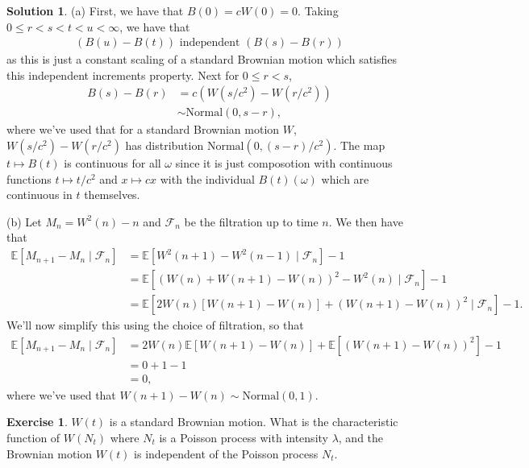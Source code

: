 \documentclass[12pt]{article}
\newcommand{\calF}{\mathcal{F}}
\newcommand{\Expect}{\mathbb{E}}
\theoremstyle{definition}
\newtheorem{exer}{Exercise}
\newtheorem{sol}{Solution}
\theoremstyle{remark}
\begin{document}
\begin{sol}
    (a) First, we have that  $B(0) = c W(0) = 0$. Taking $0 \leq r < s < t < u < \infty$, we have that
    \begin{align*}
        (B(u) - B(t)) \text{ independent } (B(s) - B(r))
    \end{align*}
    as this is just a constant scaling of a standard Brownian motion which satisfies this independent increments property.
    Next for $0\leq r < s$,
    \begin{align*}
        B(s) - B(r) &= c (W(s  / c^{2}) - W(r / c^{2}))\\
                    &\sim  \text{Normal}(0, s-r),
    \end{align*}
    where we've used that for a standard Brownian motion $W$, $W(s  / c^{2}) - W(r / c^{2})$ has distribution $\text{Normal}(0, (s - r) / c^{2})$. The map $t \mapsto B(t)$ is continuous for all $\omega$ since it is just composotion with continuous functions $t \mapsto t / c^{2}$ and $ x\mapsto cx$ with the individual $B(t)(\omega)$ which are continuous in $t$ themselves.

    (b) Let $M_{n} = W^{2}(n) - n$ and $\calF_{n}$ be the filtration up to time $n$. We then have that
    \begin{align*}
        \Expect[M_{n+1} - M_{n} \mid \calF_{n}] &= \Expect[W^{2}(n+1) - W^{2}(n-1)\mid \calF_{n}] - 1\\
                                                &= \Expect[ (W(n) + W(n+1) - W(n) )^{2} - W^{2}(n) \mid \calF_{n} ] - 1\\
                                                &= \Expect[ 2 W(n)[ W(n+1) - W(n) ] + (W(n+1) - W(n))^{2}  \mid \calF_{n}] -1.
    \end{align*}
    We'll now simplify this using the choice of filtration, so that
    \begin{align*}
        \Expect[M_{n+1} - M_{n} \mid \calF_{n}] &= 2 W(n) \Expect[ W(n+1) - W(n)] + \Expect[ (W(n+1) - W(n))^{2}] - 1\\
                                                &= 0 + 1 - 1\\
                                                &= 0,
    \end{align*}
    where we've used that $W(n + 1) - W(n) \sim \text{Normal}(0,1)$.
\end{sol}

\newpage

\begin{exer}
 $W(t)$ is a standard Brownian motion.
What is the characteristic function of $W(N_t)$ where $N_t$ is a Poisson process
with intensity $\lambda$, and the Brownian motion $W(t)$ is independent of
the Poisson process $N_t$.
\end{exer}
\end{document}
